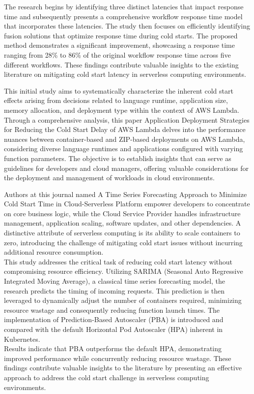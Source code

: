 The research begins by identifying three distinct latencies that impact response time and subsequently presents a comprehensive workflow response time model that incorporates these latencies. The study then focuses on efficiently identifying fusion solutions that optimize response time during cold starts. The proposed method demonstrates a significant improvement, showcasing a response time ranging from 28\% to 86\% of the original workflow response time across five different workflows. These findings contribute valuable insights to the existing literature on mitigating cold start latency in serverless computing environments.

This initial study aims to systematically characterize the inherent cold start effects arising from decisions related to language runtime, application size, memory allocation, and deployment type within the context of AWS Lambda. Through a comprehensive analysis, this paper Application Deployment Strategies for Reducing the Cold Start Delay of AWS Lambda \cite{DKL22} delves into the performance nuances between container-based and ZIP-based deployments on AWS Lambda, considering diverse language runtimes and applications configured with varying function parameters. The objective is to establish insights that can serve as guidelines for developers and cloud managers, offering valuable considerations for the deployment and management of workloads in cloud environments.

Authors at this journal named A Time Series Forecasting Approach to Minimize Cold Start Time in Cloud-Serverless Platform \cite{JSA22} empower developers to concentrate on core business logic, while the Cloud Service Provider handles infrastructure management, application scaling, software updates, and other dependencies. A distinctive attribute of serverless computing is its ability to scale containers to zero, introducing the challenge of mitigating cold start issues without incurring additional resource consumption.\\

This study addresses the critical task of reducing cold start latency without compromising resource efficiency. Utilizing SARIMA (Seasonal Auto Regressive Integrated Moving Average), a classical time series forecasting model, the research predicts the timing of incoming requests. This prediction is then leveraged to dynamically adjust the number of containers required, minimizing resource wastage and consequently reducing function launch times. The implementation of Prediction-Based Autoscaler (PBA) is introduced and compared with the default Horizontal Pod Autoscaler (HPA) inherent in Kubernetes.\\

Results indicate that PBA outperforms the default HPA, demonstrating improved performance while concurrently reducing resource wastage. These findings contribute valuable insights to the literature by presenting an effective approach to address the cold start challenge in serverless computing environments.






